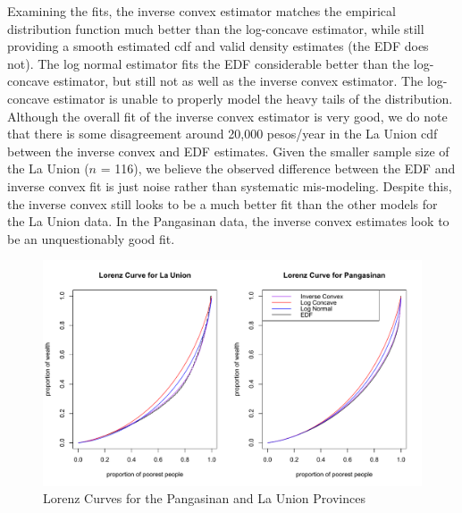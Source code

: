 \documentclass[11pt]{article}
\numberwithin{equation}{section}
\begin{document}
	Examining the fits, the inverse convex estimator matches the empirical distribution function much better than the log-concave estimator, while still providing a smooth estimated cdf and valid density estimates (the EDF does not). The log normal estimator fits the EDF considerable better than the log-concave estimator, but still not as well as the inverse convex estimator. The log-concave estimator is unable to properly model the heavy tails of the distribution. Although the overall fit of the inverse convex estimator is very good, we do note that there is some disagreement around 20,000 pesos/year in the La Union cdf between the inverse convex and EDF estimates. Given the smaller sample size of the La Union ($n$ = 116), we believe the observed difference between the EDF and inverse convex fit is just noise rather than systematic mis-modeling. Despite this, the inverse convex still looks to be a much better fit than the other models for the La Union data. In the Pangasinan data, the inverse convex estimates look to be an unquestionably good fit. 


	\begin{figure}
	\centerline{\includegraphics[width = 14cm]{LCurves.pdf} }
	\caption{Lorenz Curves for the Pangasinan and La Union Provinces}
	\end{figure} 	
	
\end{document}

